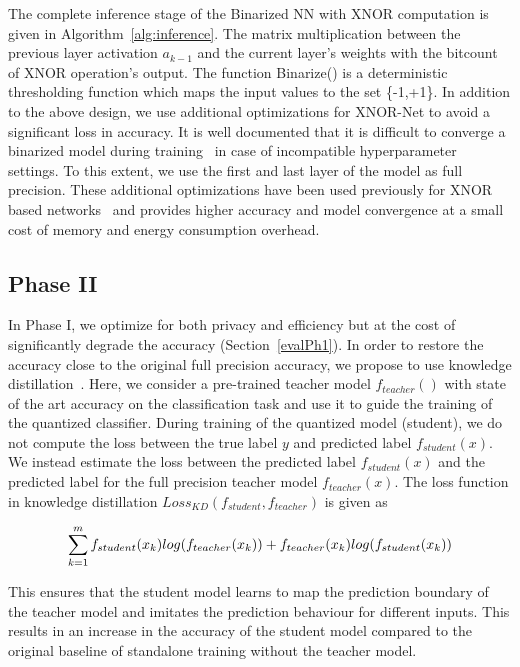The complete inference stage of the Binarized NN with XNOR computation is given in Algorithm~\ref{alg:inference}.
The matrix multiplication between the previous layer activation $a_{k-1}$ and the current layer's weights with the bitcount of XNOR operation's output.
The function Binarize() is a deterministic thresholding function which maps the input values to the set \{-1,+1\}.
In addition to the above design, we use additional optimizations for XNOR-Net to avoid a significant loss in accuracy.
It is well documented that it is difficult to converge a binarized model during training~\cite{AAAI1714619} in case of incompatible hyperparameter settings. To this extent, we use the first and last layer of the model as full precision.
These additional optimizations have been used previously for XNOR based networks~\cite{8114708,rastegari2016xnornet} and provides higher accuracy and model convergence at a small cost of memory and energy consumption overhead.







\subsection{Phase II}
\label{p2}

In Phase I, we optimize for both privacy and efficiency but at the cost of significantly degrade the accuracy (Section~\ref{evalPh1}).
In order to restore the accuracy close to the original full precision accuracy, we propose to use knowledge distillation~\cite{44873}.
Here, we consider a pre-trained teacher model $f_{teacher}()$ with state of the art accuracy on the classification task and use it to guide the training of the quantized classifier.
During training of the quantized model (student), we do not compute the loss between the true label $y$ and predicted label $f_{student}(x)$.
We instead estimate the loss between the predicted label $f_{student}(x)$ and the predicted label for the full precision teacher model $f_{teacher}(x)$.
The loss function in knowledge distillation $Loss_{KD} (f_{student}, f_{teacher})$ is given as

\begin{equation}
\footnotesize
\sum_{k=1}^m f_{student}(x_k)log(f_{teacher}(x_k)) + f_{teacher}(x_k)log(f_{student}(x_k))
\end{equation}


This ensures that the student model learns to map the prediction boundary of the teacher model and imitates the prediction behaviour for different inputs.
This results in an increase in the accuracy of the student model compared to the original baseline of standalone training without the teacher model.
